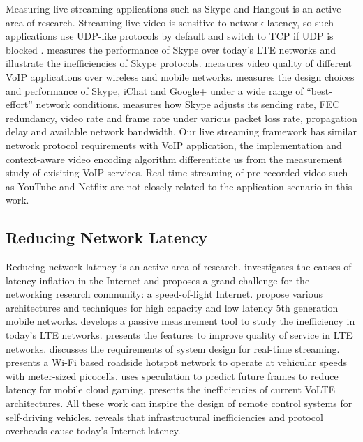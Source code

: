 Measuring live streaming applications such as Skype and Hangout
is an active area of research. 
Streaming live video is sensitive to network latency,
so such applications use UDP-like protocols by default
and switch to TCP if UDP is 
blocked \cite{yu2014can, xu2012video, zhang2012profiling}.
\cite{li2017measurement} measures the performance of Skype 
over today's LTE networks and illustrate the inefficiencies of Skype protocols.
\cite{yu2014can} measures video quality of different 
VoIP applications over wireless and mobile networks. 
\cite{xu2012video} measures the design choices and 
performance of Skype, iChat and Google+ 
under a wide range of ``best-effort'' network conditions.
\cite{zhang2012profiling} measures how Skype adjusts its sending rate, FEC redundancy,
video rate and frame rate under various packet loss rate, 
propagation delay and available network bandwidth.
Our live streaming framework has similar network protocol
requirements with VoIP application, 
the implementation and context-aware video encoding algorithm
differentiate us from the measurement study of exisiting
VoIP services. 
Real time streaming of pre-recorded video such as YouTube and Netflix \cite{rao2011network}
are not closely related to the application scenario in this work. 


\subsection{Reducing Network Latency}

Reducing network latency is an active area of research. 
\cite{singla2014internet} investigates the causes of latency inflation in the
Internet and proposes a grand challenge for the networking research 
community: a speed-of-light Internet. 
\cite{zhang20145g, agiwal2016next} propose various architectures and techniques
for high capacity and low latency 5th generation mobile networks. 
\cite{huang2013depth} develops a passive measurement tool to 
study the inefficiency in today's LTE networks. 
\cite{ali2013quality} presents the features to improve
quality of service in LTE networks. 
\cite{stonebraker20058} discusses the requirements of system
design for real-time streaming. 
\cite{song2017wifi} presents a Wi-Fi based roadside hotspot network to
operate at vehicular speeds with meter-sized picocells.
\cite{lee2015outatime} uses speculation to predict future frames to reduce 
latency for mobile cloud gaming.
\cite{tu2016volte} presents the inefficiencies of current VoLTE architectures. 
All these work can inspire the design of remote control systems for self-driving vehicles.
\cite{singla2014internet} reveals that
infrastructural inefficiencies and protocol
overheads cause today's Internet latency. 



